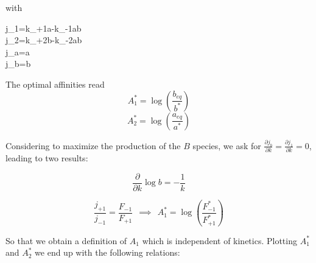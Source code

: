 \documentclass{article}
\begin{document}
	
	with \\
	\begin{center}
		\begin{cases}
			j_1=k_{+1}a-k_{-1}ab \\   j_2=k_{+2}b-k_{-2}ab   \\  j_a=\kappa a \\ j_b=\kappa b
		\end{cases}
	\end{center}
	
	\hfill \break
	The optimal affinities read
	$$A_1^*=\log \left( \frac{b_{eq}}{b^*} \right)$$
	$$A_2^*=\log \left( \frac{a_{eq}}{a^*} \right)$$
	
	Considering to maximize the production of the $B$ species, we ask for $\frac{\partial j_b}{\partial k}=\frac{\partial j_1}{\partial k}=0$, leading to two results:
	\begin{center}
		$$\frac{\partial}{\partial k} \log b = -\frac{1}{k}$$
		
		$$\frac{j_{+1}}{j_{-1}}=\frac{F_{-1}}{F_{+1}} \ \ \implies \ \ A_1^*=\log \left( \frac{F_{-1}^*}{F_{+1}^*} \right) $$
	\end{center}
	
	So that we obtain a definition of $A_1$ which is independent of kinetics. Plotting $A_1^*$ and $A_2^*$
	we end up with the following relations:
	
\end{document}
